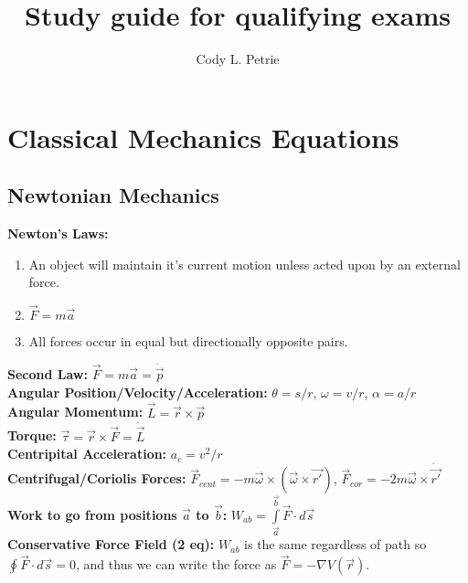 \documentclass[12pt]{extarticle}
\title{Study guide for qualifying exams}
\author{Cody L. Petrie}
\begin{document}
\maketitle

\section{Classical Mechanics Equations}
\subsection*{Newtonian Mechanics}
\textbf{Newton's Laws:}
\begin{enumerate}
  \item{An object will maintain it's current motion unless acted upon by an external force.}
  \item{$\vec{F} = m\vec{a}$}
  \item{All forces occur in equal but directionally opposite pairs.}
\end{enumerate}
\textbf{Second Law:} $\vec{F} = m\vec{a} = \dot{\vec{p}}$ \\
\textbf{Angular Position/Velocity/Acceleration:} $\theta = s/r$, $\omega = v/r$, $\alpha = a/r$ \\
\textbf{Angular Momentum:} $\vec{L} = \vec{r} \times \vec{p}$ \\
\textbf{Torque:} $\vec{\tau} = \vec{r} \times \vec{F} = \dot{\vec{L}}$ \\
\textbf{Centripital Acceleration: } $a_c = v^2/r$ \\
\textbf{Centrifugal/Coriolis Forces: } $\vec{F}_{cent} = -m\vec{\omega} \times (\vec{\omega} \times \vec{r'})$, $\vec{F}_{cor} = -2m\vec{\omega} \times \dot{\vec{r'}}$ \\
\textbf{Work to go from positions $\vec{a}$ to $\vec{b}$:} $W_{ab} = \int\limits_{\vec{a}}^{\vec{b}} \vec{F} \cdot d\vec{s}$ \\
\textbf{Conservative Force Field (2 eq):} $W_{ab}$ is the same regardless of path so $\oint \vec{F} \cdot d\vec{s} = 0$, and thus we can write the force as $\vec{F} = -\nabla V(\vec{r})$.
\end{document}
